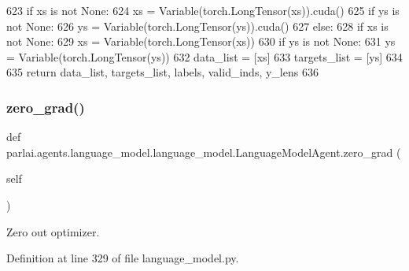 \begin{DoxyCode}
623                 \textcolor{keywordflow}{if} xs \textcolor{keywordflow}{is} \textcolor{keywordflow}{not} \textcolor{keywordtype}{None}:
624                     xs = Variable(torch.LongTensor(xs)).cuda()
625                 \textcolor{keywordflow}{if} ys \textcolor{keywordflow}{is} \textcolor{keywordflow}{not} \textcolor{keywordtype}{None}:
626                     ys = Variable(torch.LongTensor(ys)).cuda()
627             \textcolor{keywordflow}{else}:
628                 \textcolor{keywordflow}{if} xs \textcolor{keywordflow}{is} \textcolor{keywordflow}{not} \textcolor{keywordtype}{None}:
629                     xs = Variable(torch.LongTensor(xs))
630                 \textcolor{keywordflow}{if} ys \textcolor{keywordflow}{is} \textcolor{keywordflow}{not} \textcolor{keywordtype}{None}:
631                     ys = Variable(torch.LongTensor(ys))
632             data\_list = [xs]
633             targets\_list = [ys]
634 
635         \textcolor{keywordflow}{return} data\_list, targets\_list, labels, valid\_inds, y\_lens
636 
\end{DoxyCode}
\mbox{\label{classparlai_1_1agents_1_1language__model_1_1language__model_1_1LanguageModelAgent_ad7b6363acdfb3d009cd9a3bcc6206faf}} 
\subsubsection{\texorpdfstring{zero\+\_\+grad()}{zero\_grad()}}
{\footnotesize\ttfamily def parlai.\+agents.\+language\+\_\+model.\+language\+\_\+model.\+Language\+Model\+Agent.\+zero\+\_\+grad (\begin{DoxyParamCaption}\item[{}]{self }\end{DoxyParamCaption})}

\begin{DoxyVerb}Zero out optimizer.
\end{DoxyVerb}
 

Definition at line 329 of file language\+\_\+model.\+py.


